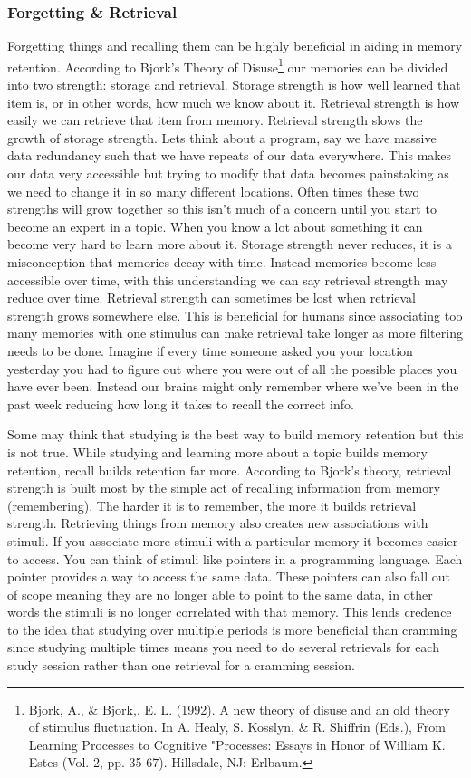 \documentclass{article}[12pt]
\begin{document}
\subsubsection{Forgetting \& Retrieval}
Forgetting things and recalling them can be highly beneficial in aiding in memory retention. According to Bjork's Theory of Disuse\footnote{\raggedright Bjork, A., \& Bjork,. E. L. (1992). A new theory of disuse and an old theory of stimulus fluctuation. In A. Healy, S. Kosslyn, \& R. Shiffrin (Eds.), From Learning Processes to Cognitive "Processes: Essays in Honor of William K. Estes (Vol. 2, pp. 35-67). Hillsdale, NJ: Erlbaum. } our memories can be divided into two strength: storage and retrieval. Storage strength is how well learned that item is, or in other words, how much we know about it. Retrieval strength is how easily we can retrieve that item from memory. Retrieval strength slows the growth of storage strength. Lets think about a program, say we have massive data redundancy such that we have repeats of our data everywhere. This makes our data very accessible but trying to modify that data becomes painstaking as we need to change it in so many different locations. Often times these two strengths will grow together so this isn't much of a concern until you start to become an expert in a topic. When you know a lot about something it can become very hard to learn more about it. Storage strength never reduces, it is a misconception that memories decay with time. Instead memories become less accessible over time, with this understanding we can say retrieval strength may reduce over time. Retrieval strength can sometimes be lost when retrieval strength grows somewhere else. This is beneficial for humans since associating too many memories with one stimulus can make retrieval take longer as more filtering needs to be done. Imagine if every time someone asked you your location yesterday you had to figure out where you were out of all the possible places you have ever been. Instead our brains might only remember where we've been in the past week reducing how long it takes to recall the correct info. 

Some may think that studying is the best way to build memory retention but this is not true. While studying and learning more about a topic builds memory retention, recall builds retention far more. According to Bjork's theory, retrieval strength is built most by the simple act of recalling information from memory (remembering). The harder it is to remember, the more it builds retrieval strength. Retrieving things from memory also creates new associations with stimuli. If you associate more stimuli with a particular memory it becomes easier to access. You can think of stimuli like pointers in a programming language. Each pointer provides a way to access the same data. These pointers can also fall out of scope meaning they are no longer able to point to the same data, in other words the stimuli is no longer correlated with that memory. This lends credence to the idea that studying over multiple periods is more beneficial than cramming since studying multiple times means you need to do several retrievals for each study session rather than one retrieval for a cramming session. 
\end{document}
